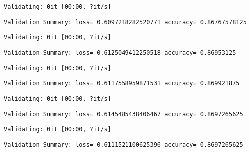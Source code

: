 \documentclass[11pt]{article}
\begin{document}
    
    \begin{Verbatim}[commandchars=\\\{\}]
Validating: 0it [00:00, ?it/s]
    \end{Verbatim}

    
    \begin{Verbatim}[commandchars=\\\{\}]
Validation Summary: loss= 0.6097218282520771 accuracy= 0.86767578125
    \end{Verbatim}

    
    \begin{Verbatim}[commandchars=\\\{\}]
Validating: 0it [00:00, ?it/s]
    \end{Verbatim}

    
    \begin{Verbatim}[commandchars=\\\{\}]
Validation Summary: loss= 0.6125049412250518 accuracy= 0.86953125
    \end{Verbatim}

    
    \begin{Verbatim}[commandchars=\\\{\}]
Validating: 0it [00:00, ?it/s]
    \end{Verbatim}

    
    \begin{Verbatim}[commandchars=\\\{\}]
Validation Summary: loss= 0.6117558959871531 accuracy= 0.869921875
    \end{Verbatim}

    
    \begin{Verbatim}[commandchars=\\\{\}]
Validating: 0it [00:00, ?it/s]
    \end{Verbatim}

    
    \begin{Verbatim}[commandchars=\\\{\}]
Validation Summary: loss= 0.6145485438406467 accuracy= 0.8697265625
    \end{Verbatim}

    
    \begin{Verbatim}[commandchars=\\\{\}]
Validating: 0it [00:00, ?it/s]
    \end{Verbatim}

    
    \begin{Verbatim}[commandchars=\\\{\}]
Validation Summary: loss= 0.6111521100625396 accuracy= 0.8697265625
    \end{Verbatim}
\end{document}
